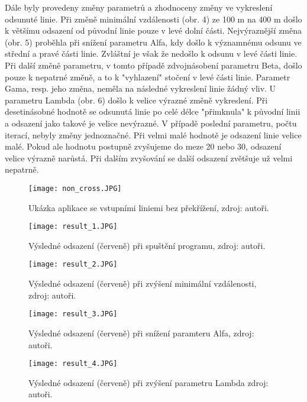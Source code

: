 \documentclass[a4paper,12pt]{article}
\begin{document}
{{{{{{    Dále byly provedeny změny parametrů a zhodnoceny změny ve vykreslení odsunuté linie. Při změně minimální vzdálenosti (obr. 4) ze 100 m na 400 m došlo k většímu odsazení od původní linie pouze v levé dolní části. Nejvýraznější změna (obr. 5) proběhla při snížení parametru Alfa, kdy došlo k významnému odsunu ve střední a pravé části linie. Zvláštní je však že nedošlo k odsunu v levé části linie. Při další změně parametru, v tomto případě zdvojnásobení parametru Beta, došlo pouze k nepatrné změně, a to k "vyhlazení" stočení v levé části linie. Parametr Gama, resp. jeho změna, neměla na následné vykreslení linie žádný vliv. U parametru Lambda (obr. 6) došlo k velice výrazné změně vykreslení. Při desetinásobné hodnotě se odsunutá linie po celé délce "přimknula" k původní linii a odsazení jako takové je velice nevýrazné. V případě poslední parametru, počtu iterací, nebyly změny jednoznačné. Při velmi malé hodnotě je odsazení linie velice malé. Pokud ale hodnotu postupně zvyšujeme do meze 20 nebo 30, odsazení velice výrazně narůstá. Při dalším zvyšování se další odsazení zvětšuje už velmi nepatrně.

    \begin{figure}[htbp]
    \texttt{[image: non\_cross.JPG]}
    \centering
    \caption{Ukázka aplikace se vstupními liniemi bez překřížení, zdroj: autoři.}
    \label{fig:obr1}
    \end{figure}
    
    \begin{figure}[htbp]
    \texttt{[image: result\_1.JPG]}
    \centering
    \caption{Výsledné odsazení (červeně) při spuštění programu, zdroj: autoři.}
    \label{fig:obr1}
    \end{figure}
    
    \begin{figure}[htbp]
    \texttt{[image: result\_2.JPG]}
    \centering
    \caption{Výsledné odsazení (červeně) při zvýšení minimální vzdálenosti, zdroj: autoři.}
    \label{fig:obr1}
    \end{figure}

    \begin{figure}[htbp]
    \texttt{[image: result\_3.JPG]}
    \centering
    \caption{Výsledné odsazení (červeně) při snížení paramteru Alfa, zdroj: autoři.}
    \label{fig:obr1}
    \end{figure}
    
    \begin{figure}[htbp]
    \texttt{[image: result\_4.JPG]}
    \centering
    \caption{Výsledné odsazení (červeně) při zvýšení parametru Lambda zdroj: autoři.}
    \label{fig:obr1}
    \end{figure}

}}}}}}
\end{document}
